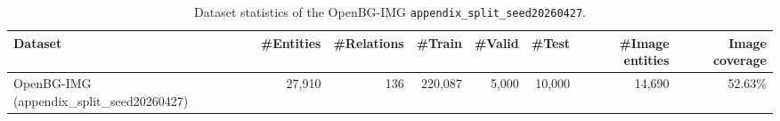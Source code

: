 \begin{table}[t]
\centering
\caption{Dataset statistics of the OpenBG-IMG \texttt{appendix\_split\_seed20260427}.}
\label{tab:dataset_statistics_appendix_split_seed20260427}
\small
\setlength{\tabcolsep}{4pt}
\begin{tabular}{lrrrrrrr}
\toprule
Dataset & \#Entities & \#Relations & \#Train & \#Valid & \#Test & \#Image entities & Image coverage \\
\midrule
OpenBG-IMG (appendix\_split\_seed20260427) & 27{,}910 & 136 & 220{,}087 & 5{,}000 & 10{,}000 & 14{,}690 & 52.63\% \\
\bottomrule
\end{tabular}
\end{table}
